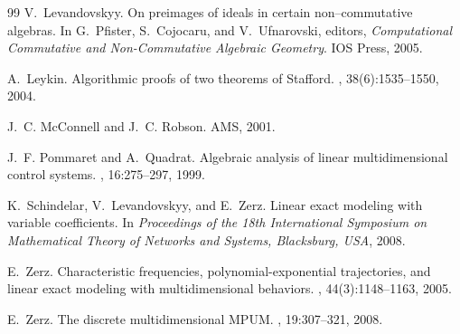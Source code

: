 \documentclass[a4paper,10pt]{article}
\theoremstyle{nonumberplain}
\begin{document}
\begin{thebibliography}{99}
V.~Levandovskyy.
\newblock On preimages of ideals in certain non--commutative algebras.
\newblock In G.~Pfister, S.~Cojocaru, and V.~Ufnarovski, editors, {\em
  Computational Commutative and Non-Commutative Algebraic Geometry}. IOS Press,
  2005.

A.~Leykin.
\newblock Algorithmic proofs of two theorems of {S}tafford.
, 38(6):1535--1550, 2004.

J.~C. McConnell and J.~C. Robson.
\newblock AMS, 2001.

J.~F. Pommaret and A.~Quadrat.
\newblock Algebraic analysis of linear multidimensional control systems.
,
  16:275--297, 1999.

K.~Schindelar, V.~Levandovskyy, and E.~Zerz.
\newblock Linear exact modeling with variable coefficients.
\newblock In {\em Proceedings of the 18th International Symposium on
  Mathematical Theory of Networks and Systems, Blacksburg, {USA}}, 2008.

E.~Zerz.
\newblock Characteristic frequencies, polynomial-exponential trajectories, and
  linear exact modeling with multidimensional behaviors.
, 44(3):1148--1163, 2005.

E.~Zerz.
\newblock The discrete multidimensional {MPUM}.
, 19:307--321,
  2008.

\end{thebibliography}
\end{document}
